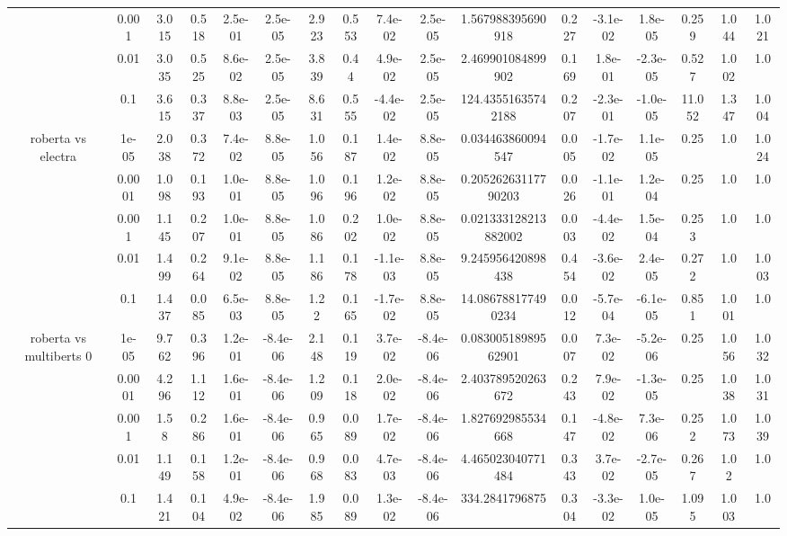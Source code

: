 \begin{tabular}{|c|c|c|c|c|c|c|c|c|c|c|c|c|c|c|c|c|}
 & 0.001 & 3.015 & 0.518 & 2.5e-01 & 2.5e-05 & 2.923 & 0.553 & 7.4e-02 & 2.5e-05 & 1.567988395690918 & 0.227 & -3.1e-02 & 1.8e-05 & 0.259 & 1.044 & 1.021 \\
 & 0.01 & 3.035 & 0.525 & 8.6e-02 & 2.5e-05 & 3.839 & 0.44 & 4.9e-02 & 2.5e-05 & 2.469901084899902 & 0.169 & 1.8e-01 & -2.3e-05 & 0.527 & 1.002 & 1.0 \\
 & 0.1 & 3.615 & 0.337 & 8.8e-03 & 2.5e-05 & 8.631 & 0.555 & -4.4e-02 & 2.5e-05 & 124.43551635742188 & 0.207 & -2.3e-01 & -1.0e-05 & 11.052 & 1.347 & 1.004 \\
\hline
\multirow{5}{*}{roberta  vs electra } & 1e-05 & 2.038 & 0.372 & 7.4e-02 & 8.8e-05 & 1.056 & 0.187 & 1.4e-02 & 8.8e-05 & 0.034463860094547 & 0.005 & -1.7e-02 & 1.1e-05 & 0.25 & 1.0 & 1.024 \\
 & 0.0001 & 1.098 & 0.193 & 1.0e-01 & 8.8e-05 & 1.096 & 0.196 & 1.2e-02 & 8.8e-05 & 0.20526263117790203 & 0.026 & -1.1e-01 & 1.2e-04 & 0.25 & 1.0 & 1.0 \\
 & 0.001 & 1.145 & 0.207 & 1.0e-01 & 8.8e-05 & 1.086 & 0.202 & 1.0e-02 & 8.8e-05 & 0.021333128213882002 & 0.003 & -4.4e-02 & 1.5e-04 & 0.253 & 1.0 & 1.0 \\
 & 0.01 & 1.499 & 0.264 & 9.1e-02 & 8.8e-05 & 1.186 & 0.178 & -1.1e-03 & 8.8e-05 & 9.245956420898438 & 0.454 & -3.6e-02 & 2.4e-05 & 0.272 & 1.0 & 1.003 \\
 & 0.1 & 1.437 & 0.085 & 6.5e-03 & 8.8e-05 & 1.22 & 0.165 & -1.7e-02 & 8.8e-05 & 14.086788177490234 & 0.012 & -5.7e-04 & -6.1e-05 & 0.851 & 1.001 & 1.0 \\
\hline
\multirow{5}{*}{roberta  vs multiberts 0} & 1e-05 & 9.762 & 0.396 & 1.2e-01 & -8.4e-06 & 2.148 & 0.119 & 3.7e-02 & -8.4e-06 & 0.08300518989562901 & 0.007 & 7.3e-02 & -5.2e-06 & 0.25 & 1.056 & 1.032 \\
 & 0.0001 & 4.296 & 1.112 & 1.6e-01 & -8.4e-06 & 1.209 & 0.118 & 2.0e-02 & -8.4e-06 & 2.403789520263672 & 0.243 & 7.9e-02 & -1.3e-05 & 0.25 & 1.038 & 1.031 \\
 & 0.001 & 1.58 & 0.286 & 1.6e-01 & -8.4e-06 & 0.965 & 0.089 & 1.7e-02 & -8.4e-06 & 1.827692985534668 & 0.147 & -4.8e-02 & 7.3e-06 & 0.252 & 1.073 & 1.039 \\
 & 0.01 & 1.149 & 0.158 & 1.2e-01 & -8.4e-06 & 0.968 & 0.083 & 4.7e-03 & -8.4e-06 & 4.465023040771484 & 0.343 & 3.7e-02 & -2.7e-05 & 0.267 & 1.02 & 1.0 \\
 & 0.1 & 1.421 & 0.104 & 4.9e-02 & -8.4e-06 & 1.985 & 0.089 & 1.3e-02 & -8.4e-06 & 334.2841796875 & 0.304 & -3.3e-02 & 1.0e-05 & 1.095 & 1.003 & 1.0 \\

\end{tabular}
